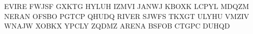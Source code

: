 EVIRE
FWJSF
GXKTG
HYLUH
IZMVI
JANWJ
KBOXK
LCPYL
MDQZM
NERAN
OFSBO
PGTCP
QHUDQ
RIVER
SJWFS
TKXGT
ULYHU
VMZIV
WNAJW
XOBKX
YPCLY
ZQDMZ
ARENA
BSFOB
CTGPC
DUHQD
